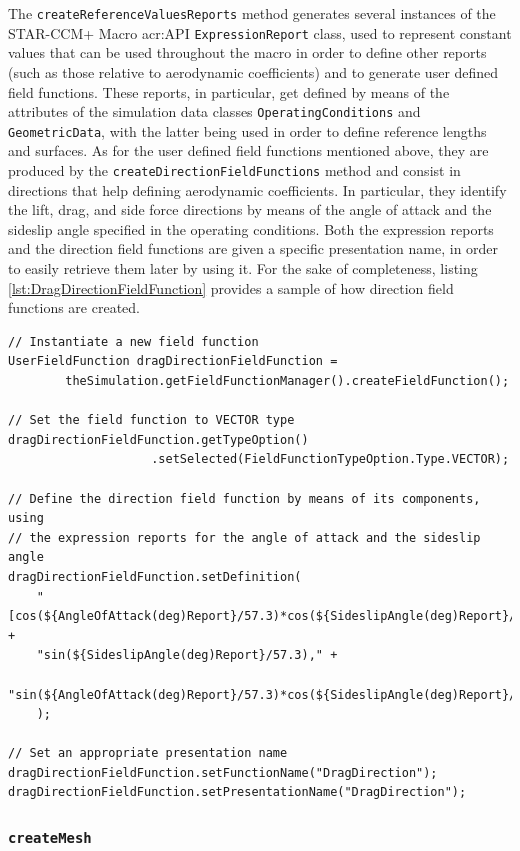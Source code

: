 The \lstinline[language=Java]!createReferenceValuesReports! method generates several instances of the STAR-CCM+ Macro \gls{acr:API} \lstinline[language=Java]!ExpressionReport! class, used to represent constant values that can be used throughout the macro in order to define other reports (such as those relative to aerodynamic coefficients) and to generate user defined field functions. These reports, in particular, get defined by means of the attributes of the simulation data classes \lstinline[language=Java]!OperatingConditions! and \lstinline[language=Java]!GeometricData!, with the latter being used in order to define reference lengths and surfaces. As for the user defined field functions mentioned above, they are produced by the \lstinline[language=Java]!createDirectionFieldFunctions! method and consist in directions that help defining aerodynamic coefficients. In particular, they identify the lift, drag, and side force directions by means of the angle of attack and the sideslip angle specified in the operating conditions. Both the expression reports and the direction field functions are given a specific presentation name, in order to easily retrieve them later by using it. For the sake of completeness, listing \ref{lst:DragDirectionFieldFunction} provides a sample of how direction field functions are created.
\bigskip
\begin{lstlisting}[caption={Drag direction field function}, captionpos=b, tabsize=2, label={lst:DragDirectionFieldFunction}]
// Instantiate a new field function
UserFieldFunction dragDirectionFieldFunction = 
		theSimulation.getFieldFunctionManager().createFieldFunction();
		
// Set the field function to VECTOR type
dragDirectionFieldFunction.getTypeOption()
					.setSelected(FieldFunctionTypeOption.Type.VECTOR);

// Define the direction field function by means of its components, using 
// the expression reports for the angle of attack and the sideslip angle
dragDirectionFieldFunction.setDefinition(
	"[cos(${AngleOfAttack(deg)Report}/57.3)*cos(${SideslipAngle(deg)Report}/57.3)," + 
	"sin(${SideslipAngle(deg)Report}/57.3)," + 
	"sin(${AngleOfAttack(deg)Report}/57.3)*cos(${SideslipAngle(deg)Report}/57.3)]"
	);
		
// Set an appropriate presentation name
dragDirectionFieldFunction.setFunctionName("DragDirection");
dragDirectionFieldFunction.setPresentationName("DragDirection");
\end{lstlisting} 

\subsubsection{\texttt{createMesh}}

